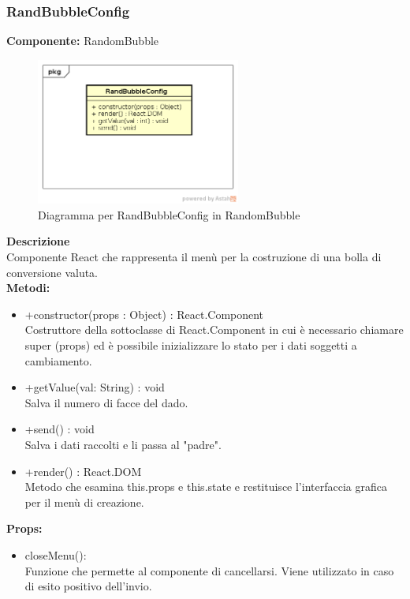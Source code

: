 \clearpage

\subsubsection{RandBubbleConfig}
\textbf{Componente:}  RandomBubble\\
   \FloatBarrier
   \begin{figure}[ht]
   \centering
   \includegraphics[width=0.6\textwidth]{img/single-RandBubbleConfig.png}
   \caption{{Diagramma per RandBubbleConfig in RandomBubble}}
\end{figure}
\FloatBarrier
\textbf{Descrizione}\\
Componente React che rappresenta il menù per la costruzione di una bolla di conversione valuta.
\\
\textbf{Metodi:} 
\begin{itemize}
\item +constructor(props : Object) : React.Component 
\\
Costruttore della sottoclasse di React.Component in cui è necessario chiamare super (props) ed è possibile inizializzare lo stato per i dati soggetti a cambiamento.

\item +getValue(val: String) : void 
\\
Salva il numero di facce del dado.

\item +send() : void 
\\
Salva i dati raccolti e li passa al "padre".

\item +render() : React.DOM \\
Metodo che esamina this.props e this.state e restituisce l'interfaccia grafica per il menù di creazione.
\end{itemize}

\textbf{Props:} 
\begin{itemize}
\item closeMenu(): 
\\
Funzione che permette al componente di cancellarsi. Viene utilizzato in caso di esito positivo dell'invio.
\end{itemize} 


